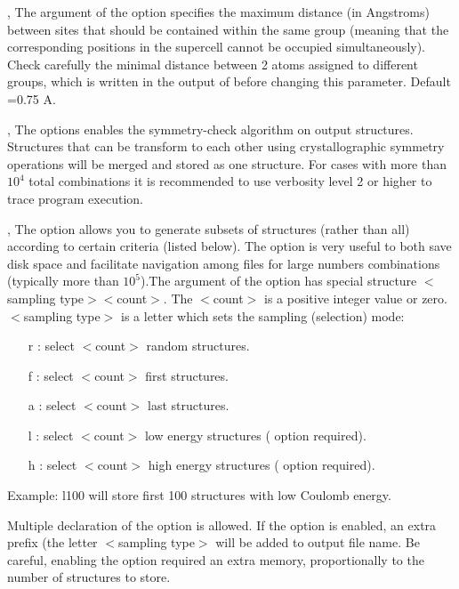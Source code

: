 \documentclass[a4paper,english]{article}
\begin{document}
\begin{Description}
\item[\OptArg{-t }{tolerance}, \OptArg{\Dd tolerance=}{tolerance}]
      The argument of the option specifies the maximum distance (in Angstroms) between sites that should be contained within the same group (meaning that the corresponding positions in the supercell cannot be occupied simultaneously). Check carefully the minimal distance between 2 atoms assigned to different groups, which is written in the output of  before changing this parameter. Default =0.75 A.

\item[\Opt{-m}, \Opt{\Dd merge-by-distance}]
      The options enables the symmetry-check algorithm on output structures. Structures that can be transform to each other using crystallographic symmetry operations will be merged and stored as one structure. For cases with more than $10^4$ total combinations it is recommended to use verbosity level 2 or higher to trace program execution.
      
\item[\OptArg{-n }{selection}, \OptArg{\Dd store-structures=}{selection}]
      The option allows you to generate subsets of structures (rather than all) according to certain criteria (listed below). The option is very useful to both save disk space and facilitate navigation among files for large numbers combinations (typically more than $10^5$).The argument of the option has special structure $<$sampling type$><$count$>$. The $<$count$>$ is a positive integer value or zero. $<$sampling type$>$ is a letter which sets the sampling (selection) mode:
      \begin{itemize}
        \item[r]: select $<$count$>$ random structures.
        \item[f]: select $<$count$>$ first structures.
        \item[a]: select $<$count$>$ last structures.
        \item[l]: select $<$count$>$ low energy structures ( option required).
        \item[h]: select $<$count$>$ high energy structures ( option required).
      \end{itemize}
      Example: l100 will store first 100 structures with low Coulomb energy.
      
      Multiple declaration of the option is allowed. If the option is enabled, an extra prefix (the letter $<$sampling type$>$ will be added to output file name. Be careful, enabling the option required an extra memory, proportionally to the number of structures to store.


\end{Description}
\end{document}
